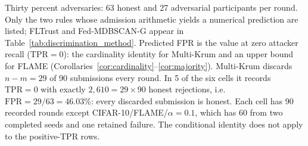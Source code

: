 \begin{table}[!t]
\par\vspace{3pt}\parbox{\linewidth}{\footnotesize Thirty percent adversaries: 63 honest and 27 adversarial participants per round. Only the two rules whose admission arithmetic yields a numerical prediction are listed; FLTrust and Fed-MDBSCAN-G appear in Table~\ref{tab:discrimination_method}. Predicted FPR is the value at zero attacker recall ($\mathrm{TPR}=0$): the cardinality identity for Multi-Krum and an upper bound for FLAME (Corollaries~\ref{cor:cardinality}--\ref{cor:majority}). Multi-Krum discards $n-m=29$ of 90 submissions every round. In 5 of the six cells it records $\mathrm{TPR}=0$ with exactly $2{,}610=29\times90$ honest rejections, i.e. $\mathrm{FPR}=29/63=46.03\%$: every discarded submission is honest. Each cell has 90 recorded rounds except CIFAR-10/FLAME/$\alpha=0.1$, which has 60 from two completed seeds and one retained failure. The conditional identity does not apply to the positive-TPR rows.}
\end{table}

